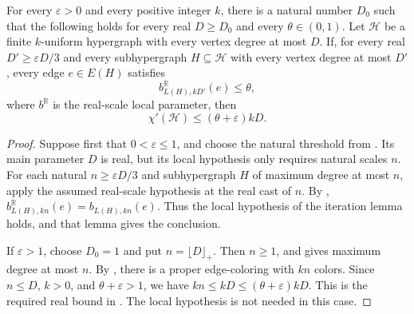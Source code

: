 \begin{theorem}
For every $\varepsilon>0$ and every positive integer $k$, there is a natural
number $D_0$ such that the following holds for every real $D\ge D_0$ and
every $\theta\in(0,1)$. Let $\mathcal H$ be a finite $k$-uniform hypergraph
with every vertex degree at most $D$. If, for every real
$D'\ge\varepsilon D/3$ and every subhypergraph $H\subseteq\mathcal H$
with every vertex degree at most $D'$, every edge $e\in E(H)$ satisfies
\[
b^{\mathbb R}_{L(H),kD'}(e)\le\theta,
\]
where $b^{\mathbb R}$ is the real-scale local parameter, then
\[
\chi'(\mathcal H)\le(\theta+\varepsilon)kD.
\]
\end{theorem}
\begin{proof}
Suppose first that $0<\varepsilon\le1$, and choose the natural threshold
from . Its main parameter
$D$ is real, but its local hypothesis only requires natural scales $n$.
For each natural $n\ge\varepsilon D/3$ and subhypergraph $H$ of maximum
degree at most $n$, apply the assumed real-scale hypothesis at the real
cast of $n$. By ,
$b^{\mathbb R}_{L(H),kn}(e)=b_{L(H),kn}(e)$. Thus the local hypothesis of
the iteration lemma holds, and that lemma gives the conclusion.

If $\varepsilon>1$, choose $D_0=1$ and put $n=\lfloor D\rfloor_+$.
Then $n\ge1$, and  gives maximum degree at
most $n$. By , there is a proper
edge-coloring with $kn$ colors. Since $n\le D$, $k>0$, and
$\theta+\varepsilon>1$, we have
$kn\le kD\le(\theta+\varepsilon)kD$.
This is the required real bound in .
The local hypothesis is not needed in this case.
\end{proof}
